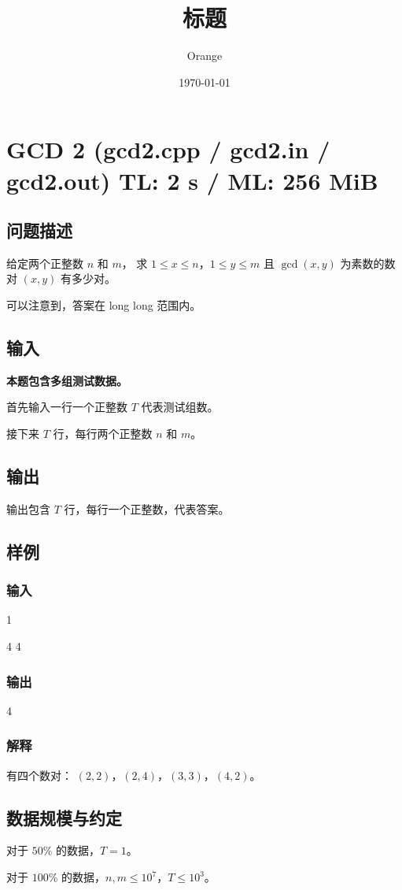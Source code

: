 \documentclass[UTF8]{article}
\title{标题}
\author{Orange}
\date{\today}
\begin{document}
	\heiti

	\section{GCD 2 \small(gcd2.cpp / gcd2.in / gcd2.out) TL: 2 s / ML: 256 MiB}
	\subsection{问题描述}
	给定两个正整数 $n$ 和 $m$，
	求 $1 \le x \le n$，$1 \le y \le m$ 且 $\gcd(x, y)$ 为素数的数对 $(x, y)$ 有多少对。

	可以注意到，答案在 long long 范围内。

	\subsection{输入}
	\textbf{本题包含多组测试数据。}

	首先输入一行一个正整数 $T$ 代表测试组数。

	接下来 $T$ 行，每行两个正整数 $n$ 和 $m$。

	\subsection{输出}
	输出包含 $T$ 行，每行一个正整数，代表答案。

	\subsection{样例}
	\subsubsection{输入}
	1

	4 4

	\subsubsection{输出}
	4

	\subsubsection{解释}
	有四个数对：
	$(2, 2)$，$(2, 4)$，$(3, 3)$，$(4,2)$。

	\subsection{数据规模与约定}
	对于 $50\%$ 的数据，$T = 1$。

	对于 $100\%$ 的数据，$n, m \le 10^7$，$T \le 10^3$。
\end{document}
